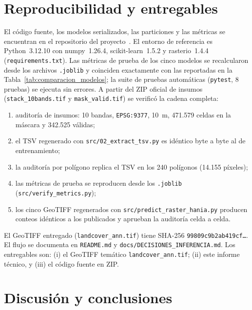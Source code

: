 \documentclass[11pt,a4paper]{article}
\begin{document}
\section{Reproducibilidad y entregables}
El código fuente, los modelos serializados, las particiones y las métricas se encuentran en el repositorio del proyecto~\cite{repo2026}. El entorno de referencia es Python~3.12.10 con numpy~1.26.4, scikit-learn~1.5.2 y rasterio~1.4.4 (\texttt{requirements.txt}). Las métricas de prueba de los cinco modelos se recalcularon desde los archivos \texttt{.joblib} y coinciden exactamente con las reportadas en la Tabla~\ref{tab:comparacion_modelos}; la suite de pruebas automáticas (\texttt{pytest}, 8 pruebas) se ejecuta sin errores. A partir del ZIP oficial de insumos (\texttt{stack\_10bands.tif} y \texttt{mask\_valid.tif}) se verificó la cadena completa:
\begin{enumerate}[noitemsep,topsep=2pt]
    \item auditoría de insumos: 10 bandas, \texttt{EPSG:9377}, 10~m, 471.579 celdas en la máscara y 342.525 válidas;
    \item el TSV regenerado con \texttt{src/02\_extract\_tsv.py} es idéntico byte a byte al de entrenamiento;
    \item la auditoría por polígono replica el TSV en los 240 polígonos (14.155 píxeles);
    \item las métricas de prueba se reproducen desde los \texttt{.joblib} (\texttt{src/verify\_metrics.py});
    \item los cinco GeoTIFF regenerados con \texttt{src/predict\_raster\_hania.py} producen conteos idénticos a los publicados y aprueban la auditoría celda a celda.
\end{enumerate}
El GeoTIFF entregado (\texttt{landcover\_ann.tif}) tiene SHA-256 \texttt{99809c9b2ab419cf\ldots}. El flujo se documenta en \texttt{README.md} y \texttt{docs/DECISIONES\_INFERENCIA.md}. Los entregables son: (i) el GeoTIFF temático \texttt{landcover\_ann.tif}; (ii) este informe técnico, y (iii) el código fuente en ZIP.

\section{Discusión y conclusiones}
\end{document}

